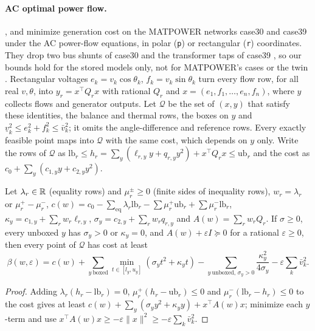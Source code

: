 \paragraph{AC optimal power flow.}
,  and  minimize generation cost on the MATPOWER networks case30 and case39 \citep{zimmerman2011-matpower-steady-state-operations-planning} under the AC power-flow equations, in polar (\texttt{p}) or rectangular (\texttt{r}) coordinates.
They drop two bus shunts of case30 and the transformer taps of case39 \citep{matpower2026-minlplib-power-flow-and-water}, so our bounds hold for the stored models only, not for MATPOWER's cases or the twin .
Rectangular voltages $e_k=v_k\cos\theta_k$, $f_k=v_k\sin\theta_k$ turn every flow row, for all real $v,\theta$, into $y_r=x^\top Q_rx$ with rational $Q_r$ and $x=(e_1,f_1,\dots,e_n,f_n)$, where $y$ collects flows and generator outputs.
Let $\mathcal Q$ be the set of $(x,y)$ that satisfy these identities, the balance and thermal rows, the boxes on $y$ and $\underline v_k^2\le e_k^2+f_k^2\le\bar v_k^2$; it omits the angle-difference and reference rows.
Every exactly feasible point maps into $\mathcal Q$ with the same cost, which depends on $y$ only.
Write the rows of $\mathcal Q$ as $\mathrm{lb}_r\le h_r=\sum_y(\ell_{r,y}y+q_{r,y}y^2)+x^\top Q_rx\le\mathrm{ub}_r$ and the cost as $c_0+\sum_y(c_{1,y}y+c_{2,y}y^2)$.

\begin{proposition}\label{prop:pf-duality}
Let $\lambda_r\in\mathbb{R}$ (equality rows) and $\mu^\pm_r\ge0$ (finite sides of inequality rows), $w_r=\lambda_r$ or $\mu^+_r-\mu^-_r$, $c(w)=c_0-\sum_{\mathrm{eq}}\lambda_r\mathrm{lb}_r-\sum\mu^+_r\mathrm{ub}_r+\sum\mu^-_r\mathrm{lb}_r$, $\kappa_y=c_{1,y}+\sum_rw_r\ell_{r,y}$, $\sigma_y=c_{2,y}+\sum_rw_rq_{r,y}$ and $A(w)=\sum_rw_rQ_r$.
If $\sigma\ge0$, every unboxed $y$ has $\sigma_y>0$ or $\kappa_y=0$, and $A(w)+\varepsilon I\succeq0$ for a rational $\varepsilon\ge0$, then every point of $\mathcal Q$ has cost at least
\[
\beta(w,\varepsilon)=c(w)+\sum_{y\ \mathrm{boxed}}\min_{t\in[l_y,u_y]}(\sigma_yt^2+\kappa_yt)-\sum_{y\ \mathrm{unboxed},\,\sigma_y>0}\frac{\kappa_y^2}{4\sigma_y}-\varepsilon\sum_k\bar v_k^2 .
\]
\end{proposition}

\begin{proof}
Adding $\lambda_r(h_r-\mathrm{lb}_r)=0$, $\mu^+_r(h_r-\mathrm{ub}_r)\le0$ and $\mu^-_r(\mathrm{lb}_r-h_r)\le0$ to the cost gives at least $c(w)+\sum_y(\sigma_yy^2+\kappa_yy)+x^\top A(w)x$; minimize each $y$-term and use $x^\top A(w)x\ge-\varepsilon\|x\|^2\ge-\varepsilon\sum_k\bar v_k^2$.
\end{proof}

